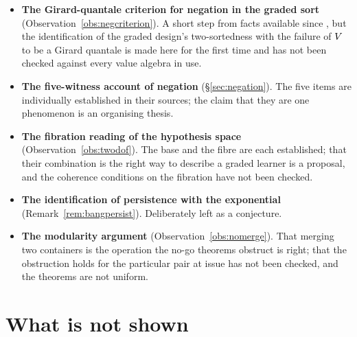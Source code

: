 \begin{itemize}[leftmargin=1.4em]
\item \textbf{The Girard-quantale criterion for negation in the graded sort}
(Observation~\ref{obs:negcriterion}). A short step from facts available since
\cite{Yetter90}, but the identification of the graded design's two-sortedness with
the failure of $V$ to be a Girard quantale is made here for the first time and has
not been checked against every value algebra in use.
\item \textbf{The five-witness account of negation} (\S\ref{sec:negation}). The
five items are individually established in their sources; the claim that they are
one phenomenon is an organising thesis.
\item \textbf{The fibration reading of the hypothesis space}
(Observation~\ref{obs:twodof}). The base and the fibre are each established; that
their combination is the right way to describe a graded learner is a proposal, and
the coherence conditions on the fibration have not been checked.
\item \textbf{The identification of persistence with the exponential}
(Remark~\ref{rem:bangpersist}). Deliberately left as a conjecture.
\item \textbf{The modularity argument} (Observation~\ref{obs:nomerge}). That
merging two containers is the operation the no-go theorems obstruct is right; that
the obstruction holds for the particular pair at issue has not been checked, and
the theorems are not uniform.
\end{itemize}

\section{What is not shown}
\label{sec:notshown}

